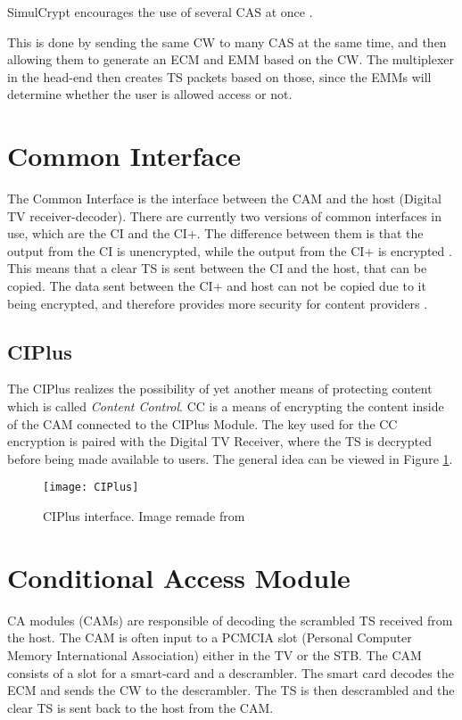 SimulCrypt encourages the use of several CAS at once \citep[p. 17]{SimulCrypt:2008}. 

This is done by sending the same CW to many CAS at the same time, and then 
allowing them to generate an ECM and EMM based on the CW. The multiplexer in the 
head-end then creates TS packets based on those, since the EMMs will determine 
whether the user is allowed access or not. 

\section{Common Interface} \label{sec:CI}
The Common Interface is the interface between the CAM and the host (Digital TV 
receiver-decoder). There are currently two versions of common interfaces in use, 
which are the CI and the CI+. The difference between them is that the output 
from the CI is unencrypted, while the output from the CI+ is encrypted 
\citep{CI+:2011}. This means that a clear TS is sent between the CI and the 
host, that can be copied. The data sent between the CI+ and host can not be 
copied due to it being encrypted, and therefore provides more security for 
content providers \citep{CI:1997}.

\subsection{CIPlus}
The CIPlus realizes the possibility of yet another means of protecting content 
which is called \emph{Content Control}. CC is a means of encrypting the content 
inside of the CAM connected to the CIPlus Module. The key used for the CC 
encryption is paired with the Digital TV Receiver, where the TS is decrypted 
before being made available to users. The general idea can be viewed in Figure \ref{img:CIPlus}.

\begin{figure}
  \centering
  \texttt{[image: CIPlus]}
  \caption{CIPlus interface. Image remade from \citep[p. 10]{CI+:2011}}
  \label{img:CIPlus}
\end{figure}

\section{Conditional Access Module}\label{sec:CAM}
CA modules (CAMs) are responsible of decoding the scrambled TS received from 
the host. The CAM is often input to a PCMCIA slot (Personal Computer Memory 
International Association) either in the TV or the STB. The CAM consists of a 
slot for a smart-card and a descrambler. The smart card decodes the ECM and 
sends the CW to the descrambler. The TS is then descrambled and the clear TS is 
sent back to the host from the CAM.
